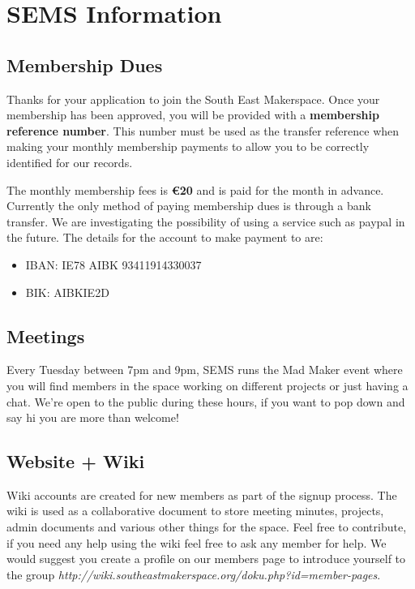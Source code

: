 \documentclass{article}
\begin{document}


\section*{SEMS Information}

\subsection*{Membership Dues}
Thanks for your application to join the South East Makerspace. Once your membership has been approved, you will be provided with a \textbf{membership reference number}. This number must be used as the transfer reference when making your monthly membership payments to allow you to be correctly identified for our records.

The monthly membership fees is \textbf{\euro20} and is paid for the month in advance. Currently the only method of paying membership dues is through a bank transfer. We are investigating the possibility of using a service such as paypal in the future. The details for the account to make payment to are:

\begin{itemize}
\item IBAN: IE78 AIBK 93411914330037
\item BIK: AIBKIE2D
\end{itemize}


\subsection*{Meetings}
Every Tuesday between 7pm and 9pm, SEMS runs the Mad Maker event where you will find members in the space working on different projects or just having a chat. We're open to the public during these hours, if you want to pop down and say hi you are more than welcome!


\subsection*{Website + Wiki}
Wiki accounts are created for new members as part of the signup process. The wiki is used as a collaborative document to store meeting minutes, projects, admin documents and various other things for the space. Feel free to contribute, if you need any help using the wiki feel free to ask any member for help. We would suggest you create a profile on our members page to introduce yourself to the group \textit{http://wiki.southeastmakerspace.org/doku.php?id=member-pages}.
\end{document}
